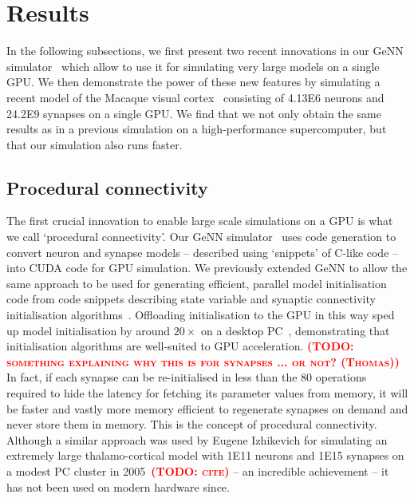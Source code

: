 \documentclass[9pt,twocolumn,twoside,lineno]{pnas-new}
\newcommand{\todo}[1]{\textbf{\textsc{\textcolor{red}{(TODO: #1)}}}}
\begin{document}
\section*{Results}
In the following subsections, we first present two recent innovations in our GeNN simulator~\citep{Yavuz2016} which allow to use it for simulating very large models on a single GPU.
We then demonstrate the power of these new features by simulating a recent model of the Macaque visual cortex~\citep{Schmidt2018} consisting of \num{4.13E6} neurons and \num{24.2E9} synapses on a single GPU.
We find that we not only obtain the same results as in a previous simulation on a high-performance supercomputer, but that our simulation also runs faster.

\subsection*{Procedural connectivity}
The first crucial innovation to enable large scale simulations on a GPU is what we call `procedural connectivity'.
Our GeNN simulator~\citep{Yavuz2016} uses code generation to convert neuron and synapse models -- described using `snippets' of C-like code -- into CUDA code for GPU simulation.
We previously extended GeNN to allow the same approach to be used for generating efficient, parallel model initialisation code from code snippets describing state variable and synaptic connectivity initialisation algorithms~\citep{Knight2018}.
Offloading initialisation to the GPU in this way sped up model initialisation by around $20\times$ on a desktop PC~\citep{Knight2018}, demonstrating that initialisation algorithms are well-suited to GPU acceleration.
\todo{something explaining why this is for synapses ... or not? (Thomas)}
In fact, if each synapse can be re-initialised in less than the 80 operations required to hide the latency for fetching its parameter values from memory, it will be faster and vastly more memory efficient to regenerate synapses on demand and never store them in memory. This is the concept of procedural connectivity. Although a similar approach was used by Eugene Izhikevich for simulating an extremely large thalamo-cortical model with \num{1E11} neurons and \num{1E15} synapses on a modest PC cluster in 2005~\todo{cite} -- an incredible achievement -- it has not been used on modern hardware since.   
\end{document}
